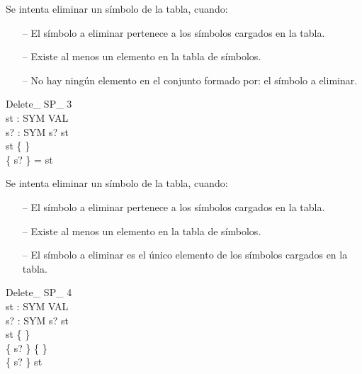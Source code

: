 \begin{tcolorbox}[colback=gray!5!white,colframe=gray!50!black,
  colbacktitle=gray!75!black,title=Delete\_ SP\_ 2]
  Se intenta eliminar un símbolo de la tabla, cuando:
     \begin{itemize}
        \item[--]{El símbolo a eliminar pertenece a los símbolos cargados en la tabla.}
        \item[--]{Existe al menos un elemento en la tabla de símbolos.}
        \item[--]{No hay ningún elemento en el conjunto formado por: el símbolo a eliminar.}
     \end{itemize}
\end{tcolorbox}


\begin{schema}{Delete\_ SP\_ 3}\\
 st : SYM \pfun VAL \\
 s? : SYM 
\where
 s? \in \dom st \\
 st \neq \{ \} \\
 \{ s? \} = \dom st
\end{schema}

\begin{tcolorbox}[colback=gray!5!white,colframe=gray!50!black,
  colbacktitle=gray!75!black,title=Delete\_ SP\_ 3]
  Se intenta eliminar un símbolo de la tabla, cuando:
     \begin{itemize}
        \item[--]{El símbolo a eliminar pertenece a los símbolos cargados en la tabla.}
        \item[--]{Existe al menos un elemento en la tabla de símbolos.}
        \item[--]{El símbolo a eliminar es el único elemento de los símbolos cargados en la tabla.}
     \end{itemize}
\end{tcolorbox}


\begin{schema}{Delete\_ SP\_ 4}\\
 st : SYM \pfun VAL \\
 s? : SYM 
\where
 s? \in \dom st \\
 st \neq \{ \} \\
 \{ s? \} \neq \{ \} \\
 \{ s? \} \subset \dom st
\end{schema}


